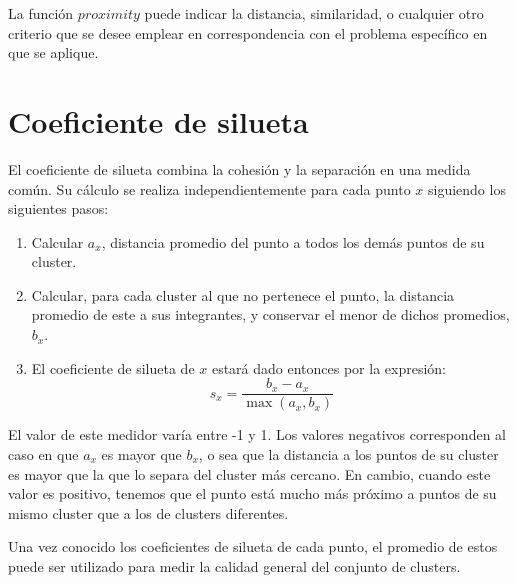 La función $proximity$ puede indicar la distancia, similaridad, o cualquier otro criterio que se desee emplear en correspondencia con el problema específico en que se aplique.


\section{Coeficiente de silueta}\label{sec:coeficienteDeSilueta}

El coeficiente de silueta combina la cohesión y la separación en una medida común.
Su cálculo se realiza independientemente para cada punto $x$ siguiendo los siguientes pasos:

\begin{enumerate}
    \item Calcular $a_x$, distancia promedio del punto a todos los demás puntos de su cluster.
    \item Calcular, para cada cluster al que no pertenece el punto, la distancia promedio de este a sus integrantes, y conservar el menor de dichos promedios, $b_x$.
    \item El coeficiente de silueta de $x$ estará dado entonces por la expresión:
    \begin{equation}
        \label{eq:silhouette-coefficient}
        s_x = \frac{b_x - a_x}{\max{(a_x, b_x)}}
    \end{equation}
\end{enumerate}

El valor de este medidor varía entre -1 y 1.
Los valores negativos corresponden al caso en que $a_x$ es mayor que $b_x$, o sea que la distancia a los puntos de su cluster es mayor que la que lo separa del cluster más cercano.
En cambio, cuando este valor es positivo, tenemos que el punto está mucho más próximo a puntos de su mismo cluster que a los de clusters diferentes.

Una vez conocido los coeficientes de silueta de cada punto, el promedio de estos puede ser utilizado para medir la calidad general del conjunto de clusters.

